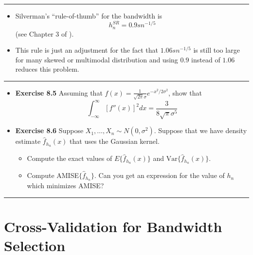 \documentclass[]{book}
\providecommand{\tightlist}{%
  \setlength{\itemsep}{0pt}\setlength{\parskip}{0pt}}
\begin{document}
\begin{center}\rule{0.5\linewidth}{\linethickness}\end{center}

\begin{itemize}
\item
  Silverman's ``rule-of-thumb'' for the bandwidth is
  \begin{equation}
  h_{n}^{SR} = 0.9 s n^{-1/5}  \nonumber
  \end{equation}
  (see Chapter 3 of \citet{silverman2018}).
\item
  This rule is just an adjustment for the fact that \(1.06 s n^{-1/5}\) is still
  too large for many skewed or multimodal distribution and using \(0.9\) instead of \(1.06\) reduces
  this problem.
\end{itemize}

\begin{center}\rule{0.5\linewidth}{\linethickness}\end{center}

\begin{itemize}
\item
  \textbf{Exercise 8.5} Assuming that \(f(x) = \tfrac{1}{\sqrt{2\pi}\sigma}e^{-x^{2}/2\sigma^{2}}\), show
  that
  \begin{equation}
  \int_{-\infty}^{\infty} [f''(x)]^{2} dx = \frac{3}{8\sqrt{\pi}\sigma^{5}} \nonumber
  \end{equation}
\item
  \textbf{Exercise 8.6} Suppose \(X_{1}, \ldots, X_{n} \sim N(0, \sigma^{2})\). Suppose that
  we have density estimate \(\hat{f}_{h_{n}}(x)\) that uses the Gaussian kernel.

  \begin{itemize}
  \tightlist
  \item
    Compute the exact values of \(E\{ \hat{f}_{h_{n}}(x) \}\) and \(\textrm{Var}\{ \hat{f}_{h_{n}}(x) \}\).
  \item
    Compute AMISE\(\{ \hat{f}_{h_{n}} \}\). Can you get an expression for the value of \(h_{n}\) which minimizes AMISE?
  \end{itemize}
\end{itemize}

\begin{center}\rule{0.5\linewidth}{\linethickness}\end{center}

\hypertarget{cross-validation-for-bandwidth-selection}{%
\section{Cross-Validation for Bandwidth Selection}\label{cross-validation-for-bandwidth-selection}}
\end{document}
